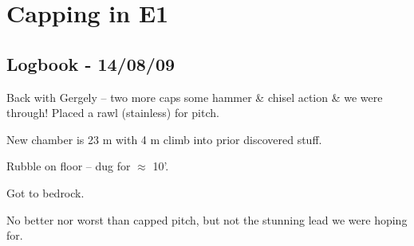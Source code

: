 \section{Capping in E1}


\subsection{Logbook - 14/08/09}

Back with Gergely -- two more caps some hammer \& chisel action \& we
were through! Placed a rawl (stainless) for pitch.

New chamber is 23 m with 4 m climb into prior discovered stuff.

Rubble on floor -- dug for $\approx$ 10'.

Got to bedrock.

No better nor worst than capped pitch, but not the stunning lead we were hoping for.




